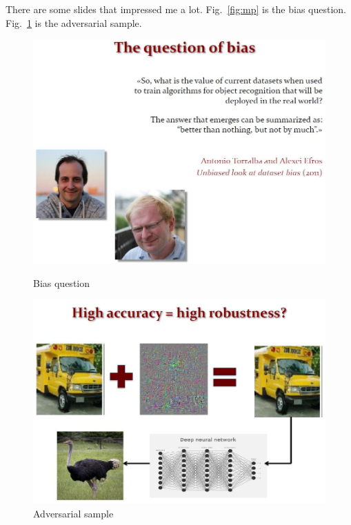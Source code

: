 \documentclass[]{IEEEtran}
\begin{document}
	There are some slides that impressed me a lot. Fig.~\ref{fig:mp} is the bias question. Fig.~\ref{fig:ss} is the adversarial sample.

\newpage
\begin{figure}[!hbt]
		\vspace{0.1cm}
			\includegraphics[width=0.7\columnwidth]{bias}
			\caption{Bias question}
			\label{fig:mp}
			\vspace{0.3cm}
		    \hspace{0.5cm}
			\includegraphics[width=0.7\columnwidth]{ad}
			\caption{Adversarial sample}
			\label{fig:ss}
	\end{figure}
\end{document}
